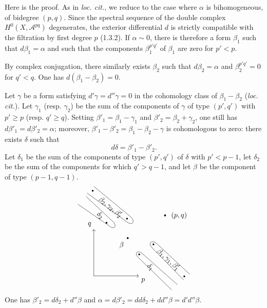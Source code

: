\documentclass[10pt]{article}
\begin{document}
Here is the proof. As in \textit{loc. cit.}, we reduce to the case where $\alpha$ is bihomogeneous, of bidegree $(p,q)$. Since the spectral sequence of the double complex $H^0(X,\mathcal A^{pq})$ degenerates, the exterior differential $d$ is strictly compatible with the filtration by first degree $p$ (1.3.2). If $\alpha\sim0$, there is therefore a form $\beta_1$ such that $d\beta_1=\alpha$ and such that the components $\beta_1^{p'q'}$ of $\beta_1$ are zero for $p'<p$.

By complex conjugation, there similarly exists $\beta_2$ such that $d\beta_2=\alpha$ and $\beta_2^{p'q'}=0$ for $q'<q$. One has $d(\beta_1-\beta_2)=0$.

Let $\gamma$ be a form satisfying $d'\gamma=d''\gamma=0$ in the cohomology class of $\beta_1-\beta_2$ (\textit{loc. cit.}). Let $\gamma_1$ (resp. $\gamma_2$) be the sum of the components of $\gamma$ of type $(p',q')$ with $p'\ge p$ (resp. $q'\ge q$). Setting $\beta'_1=\beta_1-\gamma_1$ and $\beta'_2=\beta_2+\gamma_2$, one still has $d\beta'_1=d\beta'_2=\alpha$; moreover, $\beta'_1-\beta'_2=\beta_1-\beta_2-\gamma$ is cohomologous to zero: there exists $\delta$ such that
\[
d\delta=\beta'_1-\beta'_2.
\]
Let $\delta_1$ be the sum of the components of type $(p',q')$ of $\delta$ with $p'<p-1$, let $\delta_2$ be the sum of the components for which $q'>q-1$, and let $\beta$ be the component of type $(p-1,q-1)$.
\[
\begin{tikzpicture}[x=.68cm,y=.68cm,baseline=(current bounding box.center),line cap=round,line join=round]
\draw[->] (0,0)--(3.25,0) node[below right] {$p$};
\draw[->] (0,0)--(0,3.35) node[above left] {$q$};
\fill (2.45,2.72) circle (1.3pt) node[below left=2pt] {$\beta$};
\fill (5.15,4.35) circle (1.3pt) node[right=5pt] {$(p,q)$};
\draw (-1.15,5.15)--(1.18,3.55)
  .. controls (1.48,3.34) and (1.68,3.55) .. (1.42,3.87)--(-.55,5.70);
\fill (.92,3.82) circle (1.2pt);
\node[rotate=-39] at (.45,4.35) {$\delta_2$};
\draw (-.48,5.95)--(2.42,3.86)
  .. controls (2.76,3.61) and (3.02,3.86) .. (2.70,4.22)--(.02,6.42);
\fill (-.08,6.12) circle (1.2pt);
\fill (2.40,4.12) circle (1.2pt);
\node[rotate=-39] at (1.20,4.94) {$\beta_2,\gamma_2,\beta'_2$};
\draw (5.62,-1.00)--(3.20,1.34)
  .. controls (2.91,1.62) and (3.14,1.88) .. (3.48,1.63)--(6.03,-.62);
\fill (3.28,1.55) circle (1.2pt);
\node[rotate=-43] at (4.08,.62) {$\delta_1$};
\draw (6.48,-.28)--(4.20,2.04)
  .. controls (3.90,2.35) and (4.17,2.62) .. (4.53,2.34)--(6.93,.12);
\fill (4.31,2.27) circle (1.2pt);
\fill (6.54,-.03) circle (1.2pt);
\node[rotate=-42] at (5.38,1.17) {$\beta_1,\gamma_1,\beta'_1$};
\end{tikzpicture}
\]
One has $\beta'_2=d\delta_2+d''\beta$ and $\alpha=d\beta'_2=dd\delta_2+dd''\beta=d'd''\beta$.
\end{document}
